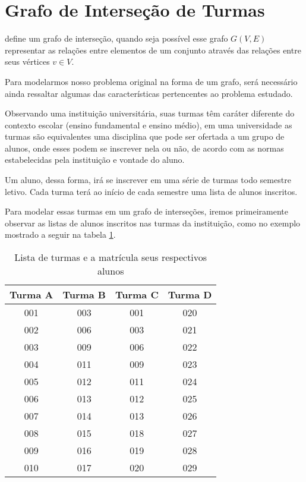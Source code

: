     

\section{Grafo de Interseção de Turmas}


 define um grafo de interseção, quando seja possível esse grafo $G(V, E)$ representar as relações entre elementos de um conjunto através das relações entre seus vértices $v \in V$.

Para modelarmos nosso problema original na forma de um grafo, será necessário ainda ressaltar algumas das características pertencentes ao problema estudado.

Observando uma instituição universitária, suas turmas têm caráter diferente do contexto escolar (ensino fundamental e ensino médio), em uma universidade as turmas são equivalentes uma disciplina que pode ser ofertada a um grupo de alunos, onde esses podem se inscrever nela ou não, de acordo com as normas estabelecidas pela instituição e vontade do aluno.

Um aluno, dessa forma, irá se inscrever em uma série de turmas todo semestre letivo. Cada turma terá ao início de cada semestre uma lista de alunos inscritos.

Para modelar essas turmas em um grafo de interseções, iremos primeiramente observar as listas de alunos inscritos nas turmas da instituição, como no exemplo mostrado a seguir na tabela \ref{tabela-lista-turmas}.

\begin{table}[H]
    \centering
    \vspace{0.5cm}
    \renewcommand\arraystretch{1.5}
    \begin{tabular}{c|c|c|c}
     
        \textbf{Turma A} & \textbf{Turma B} & \textbf{Turma C} & \textbf{Turma D} \\ %
        \hline                               %
        001   &   003  &   001   &   020  \\
        002   &   006  &   003   &   021  \\
        003   &   009  &   006   &   022  \\
        004   &   011  &   009   &   023  \\ 
        005   &   012  &   011   &   024  \\ 
        006   &   013  &   012   &   025  \\ 
        007   &   014  &   013   &   026  \\ 
        008   &   015  &   018   &   027  \\ 
        009   &   016  &   019   &   028  \\ 
        010   &   017  &   020   &   029     %
        \\
        \hline
    \end{tabular}
    \caption{Lista de turmas e a matrícula seus respectivos alunos}
    \label{tabela-lista-turmas}
\end{table}

